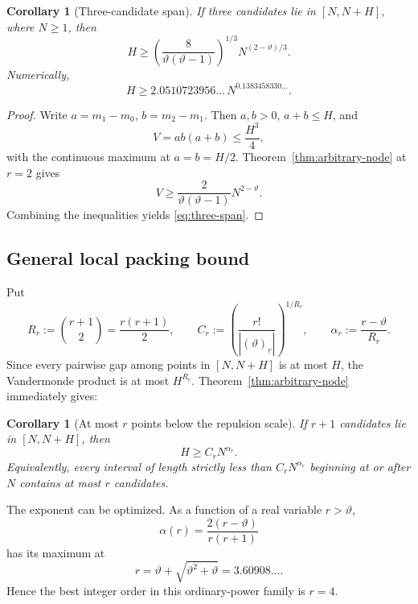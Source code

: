 \documentclass[11pt,oneside]{article}
\newtheorem{corollary}[theorem]{Corollary}
\theoremstyle{definition}
\theoremstyle{remark}
\newcommand{\thetaq}{\vartheta}
\newcommand{\fall}[2]{\left(#1\right)_{\!\underline{#2}}}
\begin{document}
\begin{corollary}[Three-candidate span]
\label{cor:three-span}
If three candidates lie in $[N,N+H]$, where $N\ge1$, then
\begin{equation}
 H\ge
 \left(\frac{8}{\thetaq(\thetaq-1)}\right)^{1/3}
 N^{(2-\thetaq)/3}.
 \label{eq:three-span}
\end{equation}
Numerically,
\[
 H\ge2.0510723956\ldots\,N^{0.1383458330\ldots}.
\]
\end{corollary}

\begin{proof}
Write $a=m_1-m_0$, $b=m_2-m_1$.  Then $a,b>0$, $a+b\le H$, and
\[
 V=a b(a+b)\le\frac{H^3}{4},
\]
with the continuous maximum at $a=b=H/2$.  Theorem~\ref{thm:arbitrary-node} at $r=2$ gives
\[
 V\ge\frac{2}{\thetaq(\thetaq-1)}N^{2-\thetaq}.
\]
Combining the inequalities yields \eqref{eq:three-span}.
\end{proof}

\subsection{General local packing bound}

Put
\[
 R_r:=\binom{r+1}{2}=\frac{r(r+1)}2,
 \qquad
 C_r:=\left(\frac{r!}{|\fall{\thetaq}{r}|}\right)^{1/R_r},
 \qquad
 \alpha_r:=\frac{r-\thetaq}{R_r}.
\]
Since every pairwise gap among points in $[N,N+H]$ is at most $H$, the Vandermonde product is
at most $H^{R_r}$.  Theorem~\ref{thm:arbitrary-node} immediately gives:

\begin{corollary}[At most $r$ points below the repulsion scale]
\label{cor:r-packing}
If $r+1$ candidates lie in $[N,N+H]$, then
\begin{equation}
 H\ge C_rN^{\alpha_r}.
 \label{eq:r-span}
\end{equation}
Equivalently, every interval of length strictly less than $C_rN^{\alpha_r}$ beginning at or
after $N$ contains at most $r$ candidates.
\end{corollary}

The exponent can be optimized.  As a function of a real variable $r>\thetaq$,
\[
 \alpha(r)=\frac{2(r-\thetaq)}{r(r+1)}
\]
has its maximum at
\[
 r=\thetaq+\sqrt{\thetaq^2+\thetaq}=3.60908\ldots.
\]
Hence the best integer order in this ordinary-power family is $r=4$.
\end{document}
